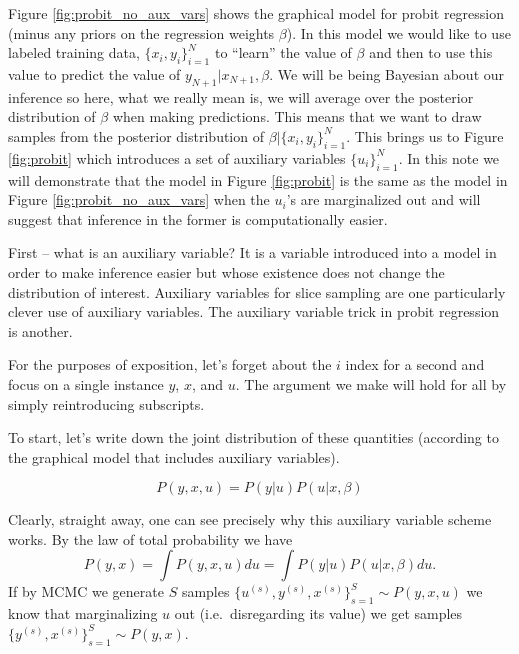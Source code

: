 \documentclass[11pt]{amsart}
\begin{document}
Figure \ref{fig:probit_no_aux_vars} shows the graphical model for probit regression (minus any priors on the regression weights $\beta$).    In this model we would like to use labeled training data, $\{x_i, y_i\}_{i=1}^N$ to ``learn'' the value of $\beta$ and then to use this value to predict the value of $y_{N+1} | x_{N+1}, \beta.$  We will be being Bayesian about our inference so here, what we really mean is, we will average over the posterior distribution of $\beta$ when making predictions.  This means that we want to draw samples from the posterior distribution of $\beta | \{x_i, y_i\}_{i=1}^N$.  This brings us to Figure \ref{fig:probit} which introduces a set of auxiliary variables $\{u_i\}_{i=1}^N$.  In this note we will demonstrate that the model in  Figure \ref{fig:probit} is the same as the model in Figure \ref{fig:probit_no_aux_vars}  when the $u_i$'s are marginalized out and will suggest that inference in the former is computationally easier.  

First -- what is an auxiliary variable?  It is a variable introduced into a model in order to make inference easier but whose existence does not change the distribution of interest.  Auxiliary variables for slice sampling are one particularly clever use of auxiliary variables.  The auxiliary variable trick in probit regression is another.

For the purposes of exposition, let's forget about the $i$ index for a second and focus on a single instance $y$, $x$, and $u$.  The argument we make will hold for all by simply reintroducing subscripts.  

To start, let's write down the joint distribution of these quantities (according to the graphical model that includes auxiliary variables).

\begin{equation}
P(y,x,u) = P(y|u)P(u|x,\beta) \label{eqn:joint}
\end{equation}

Clearly, straight away, one can see precisely why this auxiliary variable scheme works.  By the law of total probability we have
\begin{equation}
P(y,x) = \int P(y,x,u)du= \int P(y|u)P(u|x,\beta)du.  \label{eqn:joint_marginalized}
\end{equation}
If by MCMC we generate $S$ samples $\{u^{(s)},y^{(s)},x^{(s)}\}_{s=1}^S \sim P(y,x,u)$ we know that marginalizing $u$ out (i.e.~disregarding its value) we get samples $\{y^{(s)},x^{(s)}\}_{s=1}^S \sim P(y,x).$  %
\end{document}
